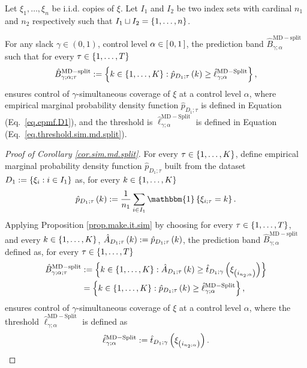 \documentclass[11pt]{article}
\begin{document}
\begin{corollary}
\label{cor.sim.md.split}
Let $\xi_1, \ldots, \xi_{n}$ be i.i.d. copies of $\xi$.
Let $I_1$ and $I_2$ be two index sets with cardinal $n_1$ and $n_2$ respectively
such that $I_1 \sqcup I_2 = \left\{ 1, \ldots, n \right\}$.

%
%
%

For any slack $\gamma \in (0,1)$, control level $\alpha \in \left[\, 0, 1 \,\right]$,
the prediction band $\hat{B}^{\mathrm{MD-split}}_{\gamma; \alpha}$ such that for every $\tau \in \left\{ 1, \ldots, T \right\}$
\begin{align}
    \label{eq.sim.md.split}
    \hat{B}^{\mathrm{MD-split}}_{\gamma; \alpha; \tau} :=
    \left\{ 
        k \in \left\{ 1, \ldots, K \right\} :
        \hat{p}_{D_1; \tau}\left( k \right)
        \geq
        \hat{\ell}_{\gamma; \alpha}^{\mathrm{MD-Split}}
     \right\},
\end{align}
ensures control of $\gamma$-simultaneous coverage of $\xi$ at a control level $\alpha$,
where empirical marginal probability density function $\hat{p}_{D_1; \tau}$ is defined in Equation (Eq.~\eqref{eq.epmf.D1}),
and the threshold is  $\hat{\ell}_{\gamma; \alpha}^{\mathrm{MD-Split}}$ is defined in Equation (Eq.~\eqref{eq.threshold.sim.md.split}).
\end{corollary}
%
%
%
\begin{proof}[Proof of Corollary \ref{cor.sim.md.split}]
For every $\tau \in \left\{ 1, \ldots, K \right\}$, define
empirical marginal probability density function $\hat{p}_{D_1; \tau}$ built from
the dataset $D_{1} := \left\{ \xi_i : i \in I_1 \right\}$ as, for every $k \in \left\{ 1, \ldots, K \right\}$
\begin{align}
\label{eq.epmf.D1}
    \hat{p}_{D_1; \tau}\paren{k}
    := \frac{1}{n_1} \sum_{i \in I_1} \mathbbm{1} \brac{\xi_{i; \tau} = k}.
\end{align}
%
%
%
Applying Proposition \ref{prop.make.it.sim} by choosing for every $\tau \in \left\{ 1, \ldots, T \right\}$,
and every $k \in \left\{ 1, \ldots, K \right\}$, $\hat{A}_{D_1; \tau} \left( k \right) := \hat{p}_{D_1; \tau} \left( k \right)$,
the prediction band $\hat{B}^{\mathrm{MD-split}}_{\gamma; \alpha}$ defined as,
for every $\tau \in \left\{ 1, \ldots, T \right\}$
\begin{align*}
    \hat{B}^{\mathrm{MD-split}}_{\gamma; \alpha; \tau}
    &
    :=
    \left\{ 
        k \in \left\{ 1, \ldots, K \right\} :
        \hat{A}_{D_1; \tau} \left( k \right)
        \geq
        \hat{t}_{D_1; \gamma} \left( \xi_{\left( i_{n_2; \alpha} \right)} \right)
     \right\}
    \\
    &
    = \left\{ 
        k \in \left\{ 1, \ldots, K \right\} :
        \hat{p}_{D_1; \tau} \left( k \right)
        \geq
        \hat{\ell}_{\gamma; \alpha}^{\mathrm{MD-Split}}
     \right\},
\end{align*}
ensures control of $\gamma$-simultaneous coverage of $\xi$ at a control level $\alpha$,
where the threshold $\hat{\ell}_{\gamma; \alpha}^{\mathrm{MD-Split}}$ is defined as
\begin{align}
    \label{eq.threshold.sim.md.split}
    \hat{\ell}_{\gamma; \alpha}^{\mathrm{MD-Split}}
    := \hat{t}_{D_1; \gamma} \left( \xi_{\left( i_{n_2; \alpha} \right)} \right).
\end{align}
\end{proof}
\end{document}
